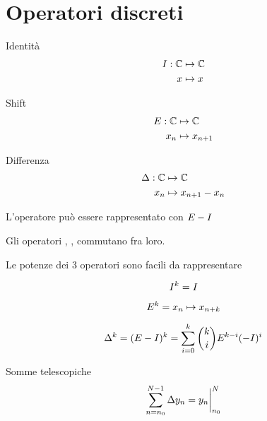 \section{Operatori discreti}

\begin{definition}{Identità}
	\begin{align}
		I : \mathbb{C} &\mapsto \mathbb{C}
		\\
		x &\mapsto x
	\end{align}
\end{definition}

\begin{definition}{Shift}
	\begin{align}
		E : \mathbb{C} &\mapsto \mathbb{C}
		\\
		x_n &\mapsto x_{n+1}
	\end{align}
\end{definition}

\begin{definition}{Differenza}
	\begin{align}
		\Delta : \mathbb{C} &\mapsto \mathbb{C}
		\\
		x_n &\mapsto x_{n+1} - x_{n}
	\end{align}
	
	L'operatore \difference può essere rappresentato con $E - I$
\end{definition}

\begin{proposition}
	Gli operatori \identity, \shift, \difference commutano fra loro.
\end{proposition}

\begin{proposition}
	Le potenze dei 3 operatori sono facili da rappresentare
	
	\begin{equation}
		I^k = I
	\end{equation}
	
	\begin{equation}
		E^k = x_n \mapsto x_{n+k}
	\end{equation}
	
	\begin{equation}
		\Delta^k
		=
		(E - I)^k
		=
		\sum
			\limits_{i=0}^{k}
			{ k \choose i }
			E^{k-i}
			(-I)^i
	\end{equation}
\end{proposition}

\begin{proposition}{Somme telescopiche}
	\begin{equation}
		\sum
			\limits_{n=n_0}^{N-1}
			\Delta y_n
		=
		y_n  \bigg\rvert_{n_0}^{N}
	\end{equation}
\end{proposition}

